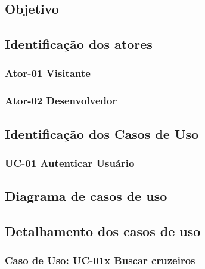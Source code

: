 
\subsection{Objetivo}

\subsection{Identificação dos atores}

\subsubsection{Ator-01 Visitante}

\subsubsection{Ator-02 Desenvolvedor}

\subsection{Identificação dos Casos de Uso}

\subsubsection{UC-01 Autenticar Usuário}

\subsection{Diagrama de casos de uso}

\subsection{Detalhamento dos casos de uso}


\subsubsection{Caso de Uso: UC-01x Buscar cruzeiros}

